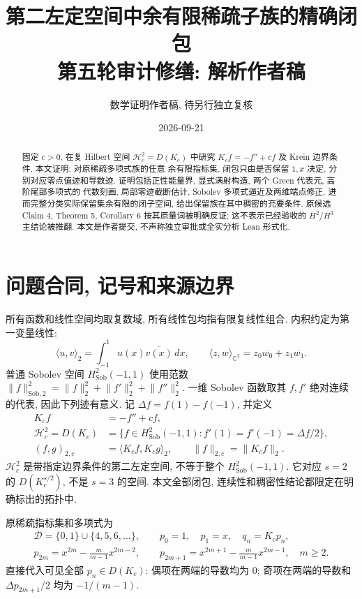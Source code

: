 \documentclass[UTF8,fontset=fandol,11pt,a4paper]{ctexart}
\title{第二左定空间中余有限稀疏子族的精确闭包\\
\large 第五轮审计修缮: 解析作者稿}
\author{数学证明作者稿, 待另行独立复核}
\date{2026-09-21}
\theoremstyle{definition}
\newcommand{\C}{\mathbb C}
\newcommand{\Hs}{H^2_{\mathrm{Sob}}(-1,1)}
\newcommand{\Hc}{\mathcal H_c^2}
\newcommand{\ip}[2]{\langle #1,#2\rangle_2}
\newcommand{\norm}[1]{\lVert #1\rVert}
\begin{document}
\maketitle
\begin{abstract}
固定 $c>0$, 在复 Hilbert 空间 $\Hc=D(K_c)$ 中研究
$K_cf=-f''+cf$ 及 Krein 边界条件. 本文证明: 对原稀疏多项式族的任意
余有限指标集, 闭包只由是否保留 $1,x$ 决定, 分别对应零点值迹和导数迹.
证明包括正性能量界, 显式满射构造, 两个 Green 代表元, 高阶尾部多项式的
代数刻画, 局部零迹截断估计, Sobolev 多项式逼近及两维端点修正.
进而完整分类实际保留集余有限的闭子空间, 给出保留族在其中稠密的充要条件.
原候选 Claim 4, Theorem 5, Corollary 6 按其原量词被明确反证;
这不表示已经验收的 $H^2/H^3$ 主结论被推翻.
本文是作者提交, 不声称独立审批或全实分析 Lean 形式化.
\end{abstract}
\tableofcontents

\section{问题合同, 记号和来源边界}
\label{sec:contract}

所有函数和线性空间均取复数域, 所有线性包均指有限复线性组合.
内积约定为第一变量线性:
\[
\ip{u}{v}=\int_{-1}^1u(x)\overline{v(x)}\,dx,
\qquad
\langle z,w\rangle_{\C^2}=z_0\overline{w_0}+z_1\overline{w_1}.
\]
普通 Sobolev 空间 $\Hs$ 使用范数
$\norm{f}_{\mathrm{Sob},2}^2=\norm{f}_2^2+\norm{f'}_2^2+\norm{f''}_2^2$.
一维 Sobolev 函数取其 $f,f'$ 绝对连续的代表, 因此下列迹有意义.
记 $\Delta f=f(1)-f(-1)$, 并定义
\begin{equation}\label{eq:domain}
\begin{split}
K_cf&=-f''+cf,\\
\Hc=D(K_c)&=\{f\in\Hs:f'(1)=f'(-1)=\Delta f/2\},\\
(f,g)_{2,c}&=\ip{K_cf}{K_cg},\qquad
\norm{f}_{2,c}=\norm{K_cf}_2.
\end{split}
\end{equation}
$\Hc$ 是带指定边界条件的第二左定空间, 不等于整个 $\Hs$.
它对应 $s=2$ 的 $D(K_c^{s/2})$, 不是 $s=3$ 的空间.
本文全部闭包, 连续性和稠密性结论都限定在明确标出的拓扑中.

原稀疏指标集和多项式为
\begin{equation}\label{eq:family}
\begin{gathered}
\mathcal D=\{0,1\}\cup\{4,5,6,\ldots\},\qquad p_0=1,\quad p_1=x,\quad q_n=K_cp_n,\\
p_{2m}=x^{2m}-\frac{m}{m-1}x^{2m-2},\qquad
p_{2m+1}=x^{2m+1}-\frac{m}{m-1}x^{2m-1},\quad m\ge2.
\end{gathered}
\end{equation}
直接代入可见全部 $p_n\in D(K_c)$: 偶项在两端的导数均为 $0$;
奇项在两端的导数和 $\Delta p_{2m+1}/2$ 均为 $-1/(m-1)$.
\end{document}
